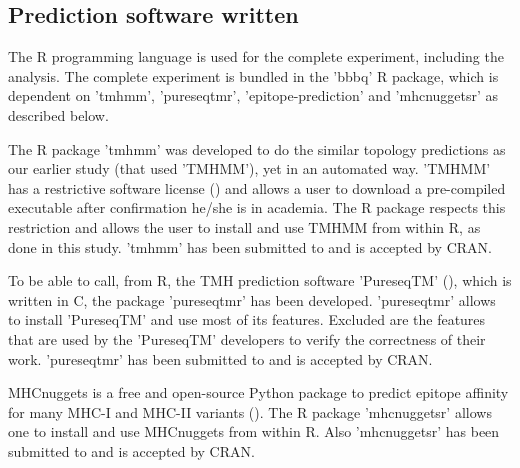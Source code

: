 \subsection{Prediction software written}

The R programming language is used for the complete 
experiment, including the analysis.
The complete experiment is bundled in the 'bbbq' R package,
which is dependent on 'tmhmm', 'pureseqtmr', 
'epitope-prediction' and 'mhcnuggetsr'
as described below.


The R package 'tmhmm' was developed to do the similar topology
predictions as our earlier study (that used 'TMHMM'), yet in an automated way.
'TMHMM' has a restrictive software license (\cite{krogh2001predicting}) and allows a user
to download a pre-compiled executable after confirmation he/she
is in academia. The R package respects this restriction
and allows the user to install and use TMHMM from within R,
as done in this study.
'tmhmm' has been submitted to and is accepted by CRAN.


To be able to call, from R, the TMH prediction 
software 'PureseqTM' (\cite{wang2019efficient}),
which is written in C, the package 'pureseqtmr' has been developed. 
'pureseqtmr' allows to install 'PureseqTM' and use most of its features.
Excluded are the features that are used by the 'PureseqTM' 
developers to verify the correctness of their work.
'pureseqtmr' has been submitted to and is accepted by CRAN.


MHCnuggets is a free and open-source Python package to predict 
epitope affinity for many MHC-I and MHC-II variants (\cite{shao2020high}).
The R package 'mhcnuggetsr' allows one to install and use MHCnuggets
from within R.
Also 'mhcnuggetsr' has been submitted to and is accepted by CRAN.

